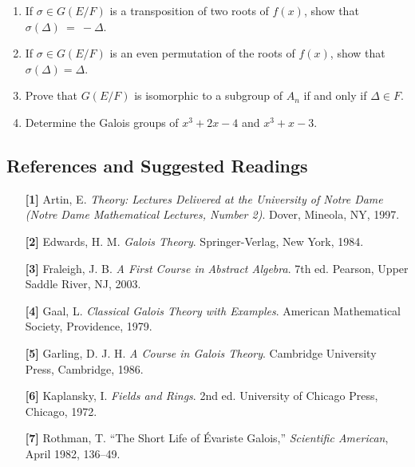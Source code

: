 {\begin{enumerate}
\begin{enumerate}
 \item
If $\sigma \in G(E/F)$ is a transposition of two roots of $f(x)$, show
that $\sigma( \Delta )~=~-\Delta$.
 
  \item
If $\sigma \in G(E/F)$ is an even permutation of the roots of $f(x)$, show
that $\sigma( \Delta ) = \Delta$.
 
  \item
Prove that $G(E/F)$ is isomorphic to a subgroup of $A_n$ if and
only if $\Delta \in F$.
 
 \item
Determine the Galois groups of $x^3 + 2 x - 4$ and $x^3 + x -3$.
 
\end{enumerate}

 
 
\end{enumerate}
}
 
 
 
 
\subsection*{References and Suggested Readings}
 
{\small
\begin{itemize}
 
\item[\textbf{[1]}] %
Artin, E. \textit{Theory: Lectures Delivered at the University of Notre Dame (Notre Dame Mathematical Lectures, Number 2)}. 
Dover, Mineola, NY, 1997.
 
\item[\textbf{[2]}]
Edwards, H. M. \textit{Galois Theory}. Springer-Verlag, New
York, 1984.
 
\item[\textbf{[3]}] %
Fraleigh, J. B. 
\textit{A First Course in Abstract Algebra}. 7th ed.
Pearson, Upper Saddle River, NJ, 2003. 
 
\item[\textbf{[4]}] %
Gaal, L. \textit{Classical Galois Theory with Examples}. 
American Mathematical Society, Providence, 1979. 
 
\item[\textbf{[5]}]
Garling, D. J. H. \textit{A Course in Galois Theory}.
Cambridge University Press, Cambridge, 1986.
 
 
\item[\textbf{[6]}] %
Kaplansky, I. \textit{Fields and Rings}. 2nd ed. University of Chicago
Press, Chicago, 1972. 
 
\item[\textbf{[7]}]
Rothman, T. ``The Short Life of \'{E}variste Galois,'' {\it
Scientific American}, April 1982, 136--49.
 
\end{itemize}
}
 
\sagesection
 
